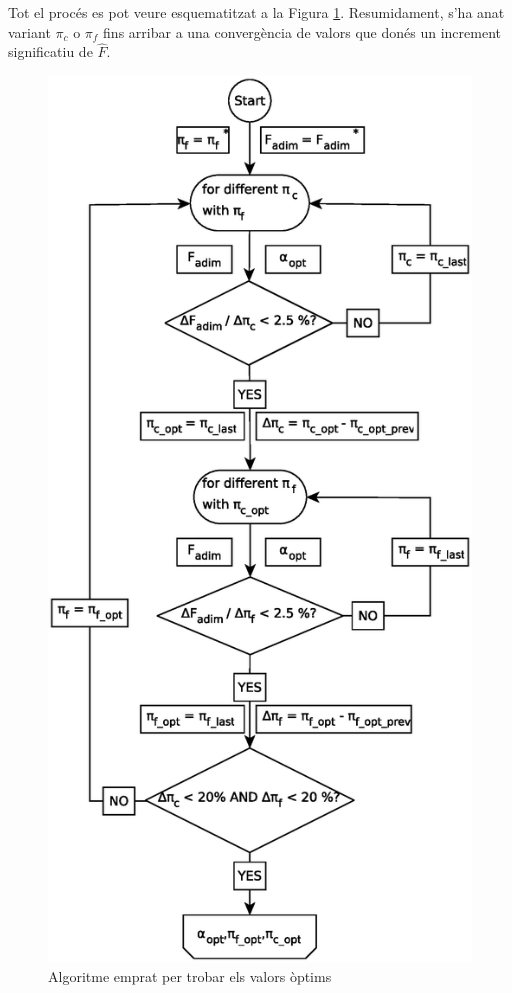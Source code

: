 Tot el procés es pot veure esquematitzat a la Figura \ref{opt}. Resumidament, s'ha anat variant $\pi_c$ o $\pi_f$ fins arribar a una convergència de valors que donés un increment significatiu de $\hat{F}$. 
\begin{figure}[H]
	\centering
	\includegraphics[scale=0.6]{./pics/optimization.eps}
	\caption{Algoritme emprat per trobar els valors òptims}
	\label{opt}
\end{figure}
